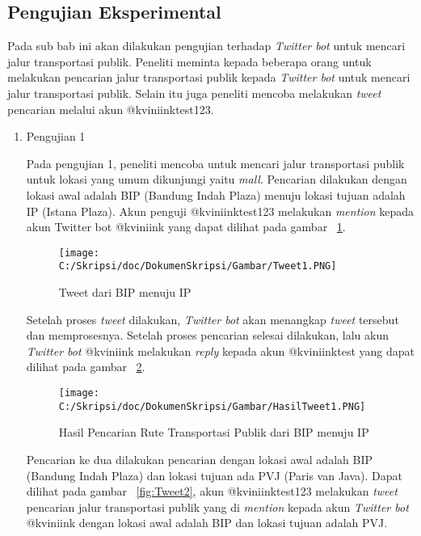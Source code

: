 \subsection{Pengujian Eksperimental}
Pada sub bab ini akan dilakukan pengujian terhadap \textit{Twitter bot} untuk mencari jalur transportasi publik. Peneliti meminta kepada beberapa orang untuk melakukan pencarian jalur transportasi publik kepada \textit{Twitter bot} untuk mencari jalur transportasi publik. Selain itu juga peneliti mencoba melakukan \textit{tweet} pencarian melalui akun @kviniinktest123.

\begin{enumerate}
	\item Pengujian 1
	
	Pada pengujian 1, peneliti mencoba untuk mencari jalur transportasi publik untuk lokasi yang umum dikunjungi yaitu \textit{mall}. Pencarian dilakukan dengan lokasi awal adalah BIP (Bandung Indah Plaza) menuju lokasi tujuan adalah IP (Istana Plaza). Akun penguji @kviniinktest123 melakukan \textit{mention} kepada akun Twitter bot @kviniink yang dapat dilihat pada gambar ~\ref{fig:Tweet1}.
	
	\begin{figure}
		\centering
			\texttt{[image: C:/Skripsi/doc/DokumenSkripsi/Gambar/Tweet1.PNG]}
		\caption{Tweet dari BIP menuju IP}
		\label{fig:Tweet1}
	\end{figure}
	
	Setelah proses \textit{tweet} dilakukan, \textit{Twitter bot} akan menangkap \textit{tweet} tersebut dan memprosesnya. Setelah proses pencarian selesai dilakukan, lalu akun \textit{Twitter bot} @kviniink melakukan \textit{reply} kepada akun @kviniinktest yang dapat dilihat pada gambar ~\ref{fig:HasilTweet1}. 
	
		
	\begin{figure}
		\centering
			\texttt{[image: C:/Skripsi/doc/DokumenSkripsi/Gambar/HasilTweet1.PNG]}
		\caption{Hasil Pencarian Rute Transportasi Publik dari BIP menuju IP}
		\label{fig:HasilTweet1}
	\end{figure}
	
	Pencarian ke dua dilakukan pencarian dengan lokasi awal adalah BIP (Bandung Indah Plaza) dan lokasi tujuan ada PVJ (Paris van Java). Dapat dilihat pada gambar ~\ref{fig:Tweet2}, akun @kviniinktest123 melakukan \textit{tweet} pencarian jalur transportasi publik yang di \textit{mention} kepada akun \textit{Twitter bot} @kviniink dengan lokasi awal adalah BIP dan lokasi tujuan adalah PVJ.
	

\end{enumerate}
